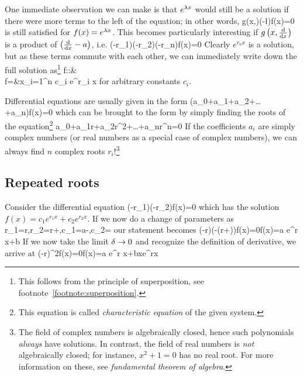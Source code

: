 One immediate observation we can make is that $e^{\lambda x}$ would still be a solution if there were more terms to the left of the equation; in other words,
\be 
g\left(x,\right)\left(-\l\right)f(x)=0
\ee 
is still satisfied for $f(x)=e^{\lambda x}$. This becomes particularly interesting if $g\left(x,\frac{\dd }{\dd x}\right)$ is a product of $\left(\frac{\dd }{\dd x}-a\right)$, i.e.
\be
\label{eq: product form diff eqn} 
\left(-r_1\right)\left(-r_2\right)\cdots\left(-r_n\right)f(x)=0
\ee 
Clearly $e^{r_nx}$ is a solution, but as these terms commute with each other, we can immediately write down the full solution as\footnote{This follows from the principle of superposition, see footnote~\ref{footnote:superposition}.}
\bea 
f::{}&{}\C\to\C\\
f={}&{}x\to \sum\limits_{i=1}^n c_i e^{r_i x}
\eea
for arbitrary constants $c_i$.

Differential equations are usually given in the form
\be 
\left(a_0+a_1+a_2+\dots+a_n\right)f(x)=0
\ee 
which can be brought to the form  by simply finding the roots of the equation\footnote{This equation is called \emph{characteristic equation} of the given system.}
\be 
a_0+a_1r+a_2r^2+\dots+a_nr^n=0
\ee 
If the coefficients $a_i$ are simply complex numbers (or real numbers as a special case of complex numbers), we can always find $n$ complex roots $r_i$!\footnote{
The field of complex numbers is algebraically closed, hence such polynomials \emph{always} have solutions. In contrast, the field of real numbers is \emph{not} algebraically closed; for instance, $x^2+1=0$ has no real root. For more information on these, see \emph{fundamental theorem of algebra}.
}

\subsection{Repeated roots}
Consider the differential equation
\be
\left(-r_1\right)\left(-r_2\right)f(x)=0
\ee 
which has the solution $f(x)=c_1 e^{r_1x}+c_2e^{r_2x}$. If we now do a change of parameters as
\be 
\label{eq: repeated root transformation}
r_1=r\;,\quad r_2=r+\de\;,\quad c_1=a-\;,\quad c_2=
\ee 
our statement becomes
\be 
\left(-r\right)\left(-(r+\de)\right)f(x)=0\quad f(x)=a e^{r x}+b
\ee 
If we now take the limit $\delta\to 0$ and recognize the definition of derivative, we arrive at
\be 
\label{eq: repeated result}
\left(-r\right)^2f(x)=0\quad\rightarrow\quad f(x)=a e^{r x}+bxe^{rx}
\ee 

